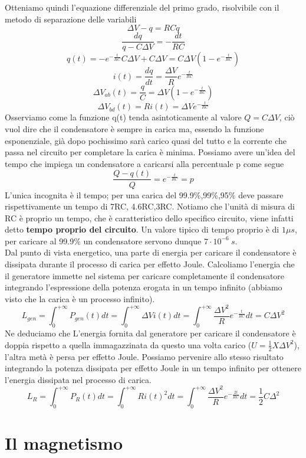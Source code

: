 \documentclass[
10pt, %
a4paper, %
oneside, %
headinclude,footinclude, %
BCOR5mm, %
]{scrartcl}
\begin{document}
Otteniamo quindi l'equazione differenziale del primo grado, risolvibile con il metodo di separazione delle variabili
\[\Delta V-q = RC \dot{q}\]
\[\frac{dq}{q-C\Delta V}= -\frac{dt}{RC}\]
\[q(t) = -e^{-\frac{t}{RC}}C\Delta V+C\Delta V = C\Delta V(1-e^{-\frac{t}{RC}})\]
\[i(t) = \frac{dq}{dt} = \frac{\Delta V}{R}e^{-\frac{t}{RC}}\]
\[\Delta V_{ab}(t)=\frac{q}{C}= \Delta V(1-e^{-\frac{t}{RC}})\]
\[\Delta V_{bd}(t)=Ri(t)= \Delta Ve^{-\frac{t}{RC}}\]
Osserviamo come la funzione q(t) tenda asintoticamente al valore \(Q=C\Delta V \), ciò vuol dire che il condensatore è sempre in carica ma, essendo la funzione esponenziale, già dopo pochissimo sarà carico quasi del tutto e la corrente che passa nel circuito per completare la carica è minima. Possiamo avere un'idea del tempo che impiega un condensatore a caricarsi alla percentuale p come segue
\[\frac{Q-q(t)}{Q} = e^{-\frac{t}{RC}}=p\]
L'unica incognita è il tempo; per una carica del 99.9\%,99\%,95\% deve passare rispettivamente un tempo di 7RC, 4.6RC,3RC. Notiamo che l'unità di misura di RC è proprio un tempo, che è caratteristico dello specifico circuito, viene infatti detto \textbf{tempo proprio del circuito}. Un valore tipico di tempo proprio è di \(1\mu s \), per caricare al 99.9\% un condensatore servono dunque \(7\cdot10^{-6}\ s\). \\
Dal punto di vista energetico, una parte di energia per caricare il condensatore è dissipata durante il processo di carica per effetto Joule. Calcoliamo l'energia che il generatore immette nel sistema per caricare completamente il condensatore integrando l'espressione della potenza erogata in un tempo infinito (abbiamo visto che la carica è un processo infinito). 
\[L_{gen} = \int_{0}^{+\infty}P_{gen}(t)dt=\int_{0}^{+\infty}\Delta V i(t)dt = \int_{0}^{+\infty}\frac{\Delta V^2}{R} e^{-\frac{t}{RC}}dt = C\Delta V^2 \]
Ne deduciamo che L'energia fornita dal generatore per caricare il condensatore è doppia rispetto a quella immagazzinata da questo una volta carico (\(U=\frac{1}{2}X\Delta V^2\)), l'altra metà è persa per effetto Joule. Possiamo pervenire allo stesso risultato integrando la potenza dissipata per effetto Joule in un tempo infinito per ottenere l'energia dissipata nel processo di carica. 
\[L_{R} = \int_{0}^{+\infty}P_{R}(t)dt =\int_{0}^{+\infty}Ri(t)^2dt = \int_{0}^{+\infty}\frac{\Delta V^2}{R}e^{-\frac{2t}{RC}}dt = \frac{1}{2}C\Delta^2\]
\section{Il magnetismo}
\end{document}
